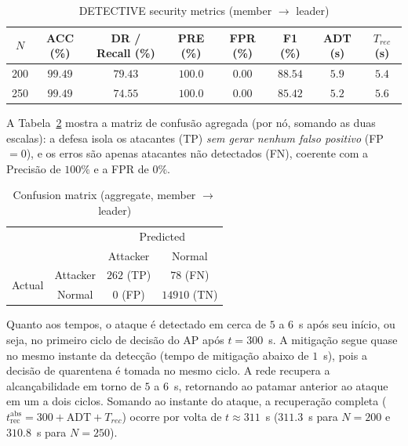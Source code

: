 \documentclass[conference]{IEEEtran}
\begin{document}
\begin{table}[t]
\centering
\caption{DETECTIVE security metrics (member $\to$ leader)}
\label{tab:seguranca}
\setlength{\tabcolsep}{9pt}
\renewcommand{\arraystretch}{1.2}
\begin{tabular}{cccccccc}
\hline
$N$ & ACC (\%) & DR / Recall (\%) & PRE (\%) & FPR (\%) & F1 (\%) & ADT (s) & $T_{rec}$ (s) \\
\hline
200 & $99.49$ & $79.43$ & $100.0$ & $0.00$ & $88.54$ & $5.9$ & $5.4$ \\
250 & $99.49$ & $74.55$ & $100.0$ & $0.00$ & $85.42$ & $5.2$ & $5.6$ \\
\hline
\end{tabular}
\end{table}

A Tabela~\ref{tab:confusao} mostra a matriz de confusão agregada (por nó, somando as
duas escalas): a defesa isola os atacantes (TP) \emph{sem gerar nenhum falso
positivo} (FP $=0$), e os erros são apenas atacantes não detectados (FN), coerente
com a Precisão de $100\%$ e a FPR de $0\%$.

\begin{table}[t]
\centering
\caption{Confusion matrix (aggregate, member $\to$ leader)}
\label{tab:confusao}
\setlength{\tabcolsep}{8pt}
\renewcommand{\arraystretch}{1.3}
\begin{tabular}{cc|cc}
\multicolumn{2}{c|}{} & \multicolumn{2}{c}{Predicted} \\
\multicolumn{2}{c|}{} & Attacker & Normal \\
\hline
\multirow{2}{*}{Actual} & Attacker & $262$ (TP) & $78$ (FN) \\
                        & Normal   & $0$ (FP)   & $14910$ (TN) \\
\hline
\end{tabular}
\end{table}

Quanto aos tempos, o ataque é detectado em cerca de $5$ a $6$~s após seu início, ou
seja, no primeiro ciclo de decisão do AP após $t=300$~s. A mitigação segue quase no
mesmo instante da detecção (tempo de mitigação abaixo de $1$~s), pois a decisão de
quarentena é tomada no mesmo ciclo. A rede recupera a alcançabilidade em torno de
$5$ a $6$~s, retornando ao patamar anterior ao ataque em um a dois ciclos. Somando
ao instante do ataque, a recuperação completa ($t_{\text{rec}}^{\text{abs}} = 300 +
\text{ADT} + T_{rec}$) ocorre por volta de $t \approx 311$~s ($311.3$~s para
$N=200$ e $310.8$~s para $N=250$).
\end{document}
